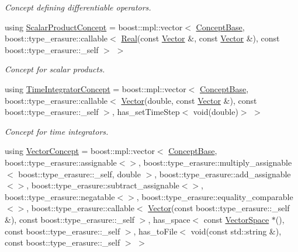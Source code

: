 \begin{DoxyCompactItemize}
\begin{DoxyCompactList}\small\item\em Concept defining differentiable operators. \end{DoxyCompactList}\item 
using \hyperlink{group__ConceptGroup_ga1308724cda3078f228fb05c29556805d_ga1308724cda3078f228fb05c29556805d}{Scalar\+Product\+Concept} = boost\+::mpl\+::vector$<$ \hyperlink{group__ConceptGroup_ga63426675cc05ccce03ead56a4fa90d96_ga63426675cc05ccce03ead56a4fa90d96}{Concept\+Base}, boost\+::type\+\_\+erasure\+::callable$<$ \hyperlink{classSpacy_1_1Real}{Real}(const \hyperlink{classSpacy_1_1Vector}{Vector} \&, const \hyperlink{classSpacy_1_1Vector}{Vector} \&), const boost\+::type\+\_\+erasure\+::\+\_\+self $>$ $>$
\begin{DoxyCompactList}\small\item\em Concept for scalar products. \end{DoxyCompactList}\item 
using \hyperlink{group__ConceptGroup_ga45ecfe57ffb996aa97c9ff89a647f095_ga45ecfe57ffb996aa97c9ff89a647f095}{Time\+Integrator\+Concept} = boost\+::mpl\+::vector$<$ \hyperlink{group__ConceptGroup_ga63426675cc05ccce03ead56a4fa90d96_ga63426675cc05ccce03ead56a4fa90d96}{Concept\+Base}, boost\+::type\+\_\+erasure\+::callable$<$ \hyperlink{classSpacy_1_1Vector}{Vector}(double, const \hyperlink{classSpacy_1_1Vector}{Vector} \&), const boost\+::type\+\_\+erasure\+::\+\_\+self $>$, has\+\_\+set\+Time\+Step$<$ void(double)$>$ $>$
\begin{DoxyCompactList}\small\item\em Concept for time integrators. \end{DoxyCompactList}\item 
using \hyperlink{group__ConceptGroup_gad6958389d1fa2758a8a64a0a24c36004_gad6958389d1fa2758a8a64a0a24c36004}{Vector\+Concept} = boost\+::mpl\+::vector$<$ \hyperlink{group__ConceptGroup_ga63426675cc05ccce03ead56a4fa90d96_ga63426675cc05ccce03ead56a4fa90d96}{Concept\+Base}, boost\+::type\+\_\+erasure\+::assignable$<$$>$, boost\+::type\+\_\+erasure\+::multiply\+\_\+assignable$<$ boost\+::type\+\_\+erasure\+::\+\_\+self, double $>$, boost\+::type\+\_\+erasure\+::add\+\_\+assignable$<$$>$, boost\+::type\+\_\+erasure\+::subtract\+\_\+assignable$<$$>$, boost\+::type\+\_\+erasure\+::negatable$<$$>$, boost\+::type\+\_\+erasure\+::equality\+\_\+comparable$<$$>$, boost\+::type\+\_\+erasure\+::callable$<$ \hyperlink{classSpacy_1_1Vector}{Vector}(const boost\+::type\+\_\+erasure\+::\+\_\+self \&), const boost\+::type\+\_\+erasure\+::\+\_\+self $>$, has\+\_\+space$<$ const \hyperlink{classSpacy_1_1VectorSpace}{Vector\+Space} $\ast$(), const boost\+::type\+\_\+erasure\+::\+\_\+self $>$, has\+\_\+to\+File$<$ void(const std\+::string \&), const boost\+::type\+\_\+erasure\+::\+\_\+self $>$ $>$
$$
\end{DoxyCompactItemize}
